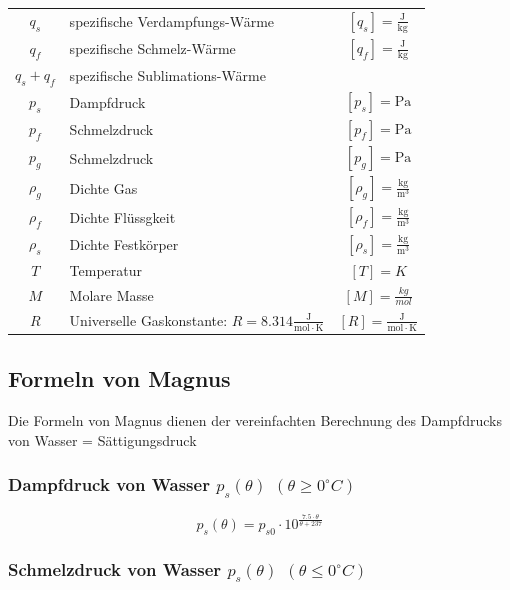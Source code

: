 \begin{tabular}{c l c}
	\rule{0pt}{10pt}$q_s$ & spezifische Verdampfungs-Wärme & $[q_s] = \mathrm{\frac{J}{kg}}$ \\
	\rule{0pt}{10pt}$q_f$ & spezifische Schmelz-Wärme & $[q_f] = \mathrm{\frac{J}{kg}}$ \\
	$q_s + q_f$ & spezifische Sublimations-Wärme & \\
	$p_s$ & Dampfdruck & $[p_s] = \mathrm{Pa}$ \\
	$p_f$ & Schmelzdruck & $[p_f] = \mathrm{Pa}$ \\
	$p_g$ & Schmelzdruck & $[p_g] = \mathrm{Pa}$ \\
	\rule{0pt}{10pt}$\rho_g$ & Dichte Gas & $[\rho_g] = \mathrm{\frac{kg}{m^3}}$ \\
	\rule{0pt}{10pt}$\rho_f$ & Dichte Flüssgkeit & $[\rho_f] = \mathrm{\frac{kg}{m^3}}$ \\
	\rule{0pt}{10pt}$\rho_s$ & Dichte Festkörper & $[\rho_s] = \mathrm{\frac{kg}{m^3}}$ \\
	$T$ & Temperatur   & $[T] = K$ \\
	$M$ & Molare Masse & $[M] = \frac{kg}{mol}$ \\
	\rule{0pt}{8pt}$R$ & Universelle Gaskonstante: $R = 8.314 \mathrm{\frac{J}{mol \cdot K}}$ & $[R] = \mathrm{\frac{J}{mol \cdot K}} $ \\
\end{tabular}





\subsection{Formeln von Magnus}
Die Formeln von Magnus dienen der vereinfachten Berechnung des Dampfdrucks von Wasser = Sättigungsdruck 

\subsubsection{Dampfdruck von Wasser $p_s(\theta)$ $(\theta \geq 0 ^{\circ}C)$}


$$ \boxed{ p_s(\theta) = p_{s0} \cdot 10^{ \frac{7.5 \cdot \theta}{\theta + 237}  } } $$



\subsubsection{Schmelzdruck von Wasser $p_s(\theta)$ $ (\theta \leq 0 ^{\circ}C)$}

